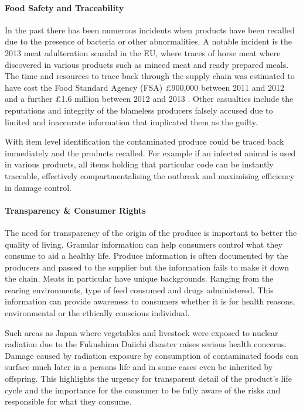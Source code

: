 \documentclass[a4paper, 11pt]{article}
\begin{document}
\paragraph{Food Safety and Traceability}
In the past there has been numerous incidents when products have been recalled due to the presence of bacteria or other abnormalities. A notable incident is the 2013 meat adulteration scandal in the EU, where traces of horse meat where discovered in various products such as minced meat and ready prepared meals. The time and resources to trace back through the supply chain was estimated to have cost the Food Standard Agency (FSA) \pounds900,000 between 2011 and 2012 and a further \pounds1.6 million between 2012 and 2013 \cite{FSA}. Other casualties include the reputations and integrity of the blameless producers falsely accused due to limited and inaccurate information that implicated them as the guilty.\cite{horsy}

With item level identification the contaminated produce could be traced back immediately and the products recalled.\cite{rfidFood}\cite{rfidFood2} For example if an infected animal is used in various products, all items holding that particular code can be instantly traceable, effectively compartmentalising the outbreak and maximising efficiency in damage control.

\paragraph{Transparency \& Consumer Rights}

The need for transparency of the origin of the produce is important to better the quality of living. Granular information can help consumers control what they consume to aid a healthy life. Produce information is often documented by the producers and passed to the supplier but the information fails to make it down the chain.\cite{FSA} Meats in particular have unique backgrounds. Ranging from the rearing environments, type of feed consumed and drugs administered. This information can provide awareness to consumers whether it is for health reasons, environmental or the ethically conscious individual.

Such areas as Japan where vegetables and livestock were exposed to nuclear radiation due to the Fukushima Daiichi disaster raises serious health concerns. Damage caused by radiation exposure by consumption of contaminated foods can surface much later in a persons life and in some cases even be inherited by offspring. This highlights the urgency for transparent detail of the product's life cycle and the importance for the consumer to be fully aware of the risks and responsible for what they consume.\cite{fukushima}
\end{document}
